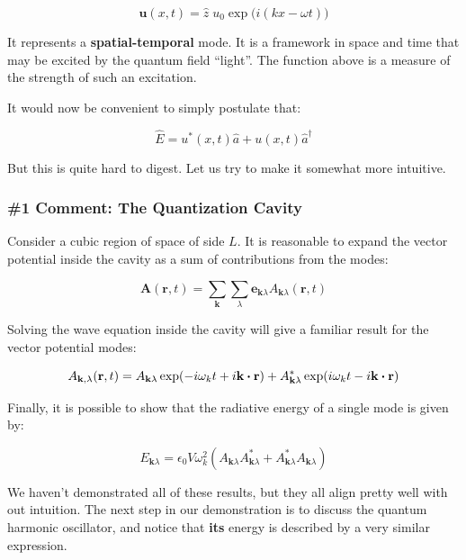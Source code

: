 \documentclass[12pt,a4paper]{report}
\begin{document}
\begin{equation}
    \textbf{u}(x,t)=\hat{z}\;u_0\exp\big(i(kx-\omega t)\big)
\end{equation}

It represents a \textbf{spatial-temporal} mode. It is a framework in space and time that may be excited by the quantum field ``light''. The function above is a measure of the strength of such an excitation.

It would now be convenient to simply postulate that:

\begin{equation}
    \hat{E}=u^*(x,t)\hat{a}+u(x,t)\hat{a}^\dag
\end{equation}

But this is quite hard to digest. Let us try to make it somewhat more intuitive.

\subsubsection{\#1 Comment: The Quantization Cavity}

Consider a cubic region of space of side $L$. It is reasonable to expand the vector potential inside the cavity as a sum of contributions from the modes:

\begin{equation}
    \textbf{A}(\textbf{r},t)=\sum_{\textbf{k}}\sum_{\lambda}\textbf{e}_{\textbf{k}\lambda} A_{\textbf{k}\lambda}(\textbf{r},t)
\end{equation}

Solving the wave equation inside the cavity will give a familiar result for the vector potential modes:

\begin{equation}
    A_{\textbf{k},\lambda}(\textbf{r},t)=A_{\textbf{k}\lambda}\exp(-i\omega_kt+i\textbf{k}\vdot\textbf{r})+A^{*}_{\textbf{k}\lambda}\exp(i\omega_kt-i\textbf{k}\vdot\textbf{r})
\end{equation}

Finally, it is possible to show that the radiative energy of a single mode is given by:

\begin{equation}
    E_{\textbf{k}\lambda}=\epsilon_0 V\omega_k^2(A_{\textbf{k}\lambda}A^*_{\textbf{k}\lambda}+A^*_{\textbf{k}\lambda}A_{\textbf{k}\lambda})
\end{equation}

We haven't demonstrated all of these results, but they all align pretty well with out intuition. The next step in our demonstration is to discuss the quantum harmonic oscillator, and notice that \textbf{its} energy is described by a very similar expression.
\end{document}
